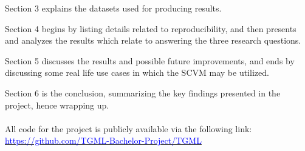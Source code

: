 Section 3 explains the datasets used for producing results.

Section 4 begins by listing details related to reproducibility, and then presents and analyzes the results which relate to answering the three research questions.

Section 5 discusses the results and possible future improvements, and ends by discussing some real life use cases in which the SCVM may be utilized.

Section 6 is the conclusion, summarizing the key findings presented in the project, hence wrapping up.
\\\\
All code for the project is publicly available via the following link:
\\
\href{https://github.com/TGML-Bachelor-Project/TGML}{\textcolor{blue}{https://github.com/TGML-Bachelor-Project/TGML}}





